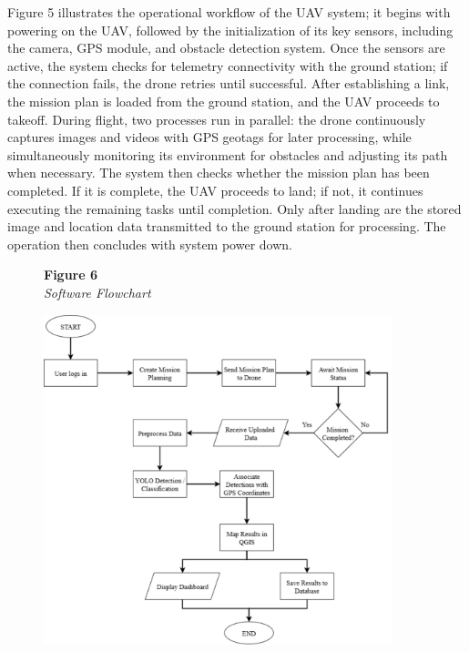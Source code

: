 	Figure 5 illustrates the operational workflow of the UAV system; it begins with powering on the UAV, followed by the initialization of its key sensors, including the camera, GPS module, and obstacle detection system. Once the sensors are active, the system checks for telemetry connectivity with the ground station; if the connection fails, the drone retries until successful. After establishing a link, the mission plan is loaded from the ground station, and the UAV proceeds to takeoff. During flight, two processes run in parallel: the drone continuously captures images and videos with GPS geotags for later processing, while simultaneously monitoring its environment for obstacles and adjusting its path when necessary. The system then checks whether the mission plan has been completed. If it is complete, the UAV proceeds to land; if not, it continues executing the remaining tasks until completion. Only after landing are the stored image and location data transmitted to the ground station for processing. The operation then concludes with system power down.
	
	\begin{figure}[H]
		\raggedright
		\textbf{Figure 6} \\ %
		\textit{Software Flowchart} %
		
		\vspace{0.5em}
		\centering
		\includegraphics[width=0.9\textwidth]{figures/SoftFlow.pdf} %
		
		\vspace{0.5em}
		\raggedright
		
		\label{fig:SoftFlow}
	\end{figure}
	
